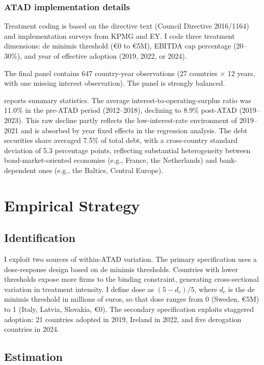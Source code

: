 \documentclass[12pt]{article}
\begin{document}
\subsubsection*{ATAD implementation details} Treatment coding is based on the directive text (Council Directive 2016/1164) and implementation surveys from KPMG and EY. I code three treatment dimensions: de minimis threshold (\euro{}0 to \euro{}5M), EBITDA cap percentage (20--30\%), and year of effective adoption (2019, 2022, or 2024).

The final panel contains 647 country-year observations (27 countries $\times$ 12 years, with one missing interest observation). The panel is strongly balanced.



 reports summary statistics. The average interest-to-operating-surplus ratio was 11.0\% in the pre-ATAD period (2012--2018), declining to 8.9\% post-ATAD (2019--2023). This raw decline partly reflects the low-interest-rate environment of 2019--2021 and is absorbed by year fixed effects in the regression analysis. The debt securities share averaged 7.5\% of total debt, with a cross-country standard deviation of 5.3 percentage points, reflecting substantial heterogeneity between bond-market-oriented economies (e.g., France, the Netherlands) and bank-dependent ones (e.g., the Baltics, Central Europe).


\section{Empirical Strategy}

\subsection{Identification}

I exploit two sources of within-ATAD variation. The primary specification uses a dose-response design based on de minimis thresholds. Countries with lower thresholds expose more firms to the binding constraint, generating cross-sectional variation in treatment intensity. I define dose as $(5 - d_c)/5$, where $d_c$ is the de minimis threshold in millions of euros, so that dose ranges from 0 (Sweden, \euro{}5M) to 1 (Italy, Latvia, Slovakia, \euro{}0). The secondary specification exploits staggered adoption: 21 countries adopted in 2019, Ireland in 2022, and five derogation countries in 2024.

\subsection{Estimation}
\end{document}
